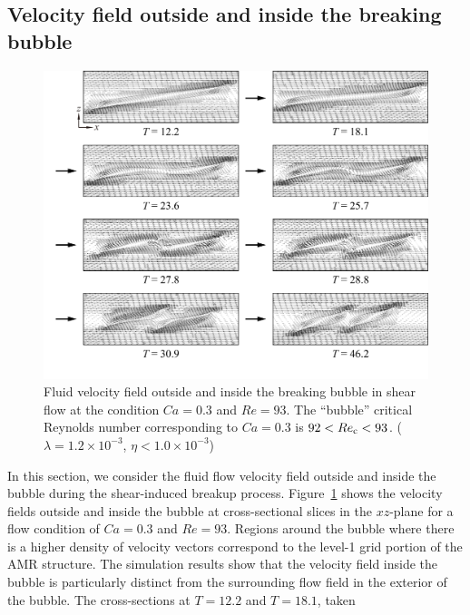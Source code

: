 \documentclass[%
 reprint,
 showkeys,
 amsmath,amssymb,
 aps,
 prfluids,
 onecolumn
]{revtex4-2}
\begin{document}
\subsection{Velocity field outside and inside the breaking bubble}
%
\begin{figure}%
  \centering
  \includegraphics[width=\textwidth]{BubbleFieldCa0p3Re93}
  \caption{Fluid velocity field outside and inside the breaking bubble in
           shear flow at the condition $Ca=0.3$ and $Re=93$.
	   The ``bubble'' 
	   critical Reynolds number corresponding to $Ca=0.3$ is
	   $92<Re_{\rm c}<93$.
           ($\lambda = 1.2 \times 10^{-3}$, $\eta < 1.0 \times 10^{-3}$) 
	   }
  \label{fig:BubbleFieldCa0p3Re93}
\end{figure}
%
In this section, we consider the fluid flow velocity field outside and inside
the bubble during the shear-induced breakup process.
Figure~\ref{fig:BubbleFieldCa0p3Re93} shows the velocity fields outside and
inside the bubble at cross-sectional slices in the $xz$-plane for a flow
condition of $Ca = 0.3$ and $Re = 93$.  Regions around the bubble where there
is a higher density of velocity vectors correspond to the level-1 grid portion
of the AMR structure.  The simulation results show that the velocity field
inside the bubble is particularly distinct from the surrounding flow field in
the exterior of the bubble.  The cross-sections at $T=12.2$ and $T=18.1$, taken
\end{document}
